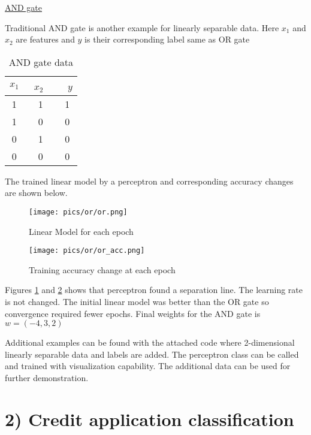 \documentclass[11pt]{article}
\begin{document}
\underline{AND gate} \medskip

Traditional AND gate is another example for linearly separable data. Here $x_1$ and $x_2$ are features and $y$ is their corresponding label same as OR gate
\bgroup
\def\arraystretch{1.5}%
\begin{table}[H]
\centering
\caption{AND gate data}
\begin{tabular}{|c|c|c|}
\hline
$x_1$   & \ $x_2$ \  & \ $y$  \\ \hline
1 & 1 & 1 \\ \hline
1 & 0 & 0\\ \hline
0 & 1 & 0 \\ \hline
0 & 0 & 0 \\ \hline
\end{tabular}
\label{table:and}
\end{table}
\egroup

The trained linear model by a perceptron and corresponding accuracy changes are shown below.

\begin{multicols}{2}

\begin{figure}[H]
\centering
\texttt{[image: pics/or/or.png]}
\captionsetup{justification=centering}
\caption{Linear Model for each epoch}
\label{fig:and}
\end{figure}

\begin{figure}[H]
\centering
\texttt{[image: pics/or/or\_acc.png]}
\captionsetup{justification=centering}
\caption{Training accuracy change at each epoch}
\label{fig:and_acc}
\end{figure}

\end{multicols}

Figures \ref{fig:and} and \ref{fig:and_acc} shows that perceptron found a separation line. The learning rate is not changed. The initial linear model was better than the OR gate so convergence required fewer epochs. Final weights for the AND gate is $w=(-4, 3 ,2)$ \medskip

Additional examples can be found with the attached code where 2-dimensional linearly separable data and labels are added. The perceptron class can be called and trained with visualization capability. The additional data can be used for further demonstration. \newpage


\section*{2) Credit application classification} 
\end{document}
